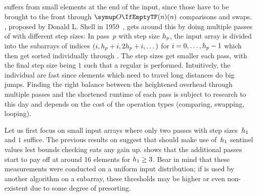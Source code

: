 \subsection{\texorpdfstring{\ShS{}}{ShellSort}}
\label{subsec:single:shell}


\IS{} suffers from small elements at the end of the input, since those have to be brought to the front through \(\bigoh{n}\) comparisons and swaps.
\ShS{}, proposed by Donald L. Shell in 1959~\cite{Shell1959AHS}, gets around this by doing multiple passes of \IS{} with different step sizes:
In pass~\(p\) with step size \(h_p\), the input array is divided into the subarrays of indices \((i, h_p + i, 2 h_p + i, \dots)\) for \(i = 0, \dots, h_p - 1\) which then get sorted individually through \IS{}.
The step sizes get smaller each pass, with the final step size being \(1\) such that a regular \IS{} is performed.
Intuitively, the individual \IS*{} are fast since elements which need to travel long distances do big jumps.
Finding the right balance between the heightened overhead through multiple \IS{} passes and the shortened runtime of each \IS{} pass is subject to research to this day \cite{skean2023optimization,lee2021empirically} and depends on the cost of the operation types (comparing, swapping, looping).

Let us first focus on small input arrays where only two passes with step sizes~\(h_1\) and \(1\) suffice.
The previous results on \IS{} suggest that \ShS{} should make use of~\(h_1\) sentinel values lest bounds checking eats any gain up.
 shows that the additional passes start to pay off at around 16 elements for \(h_1 \ge 3\).
Bear in mind that these measurements were conducted on a uniform input distribution;
if \ShS{} is used by another algorithm on a subarray, these thresholds may be higher or even non-existent due to some degree of presorting.

